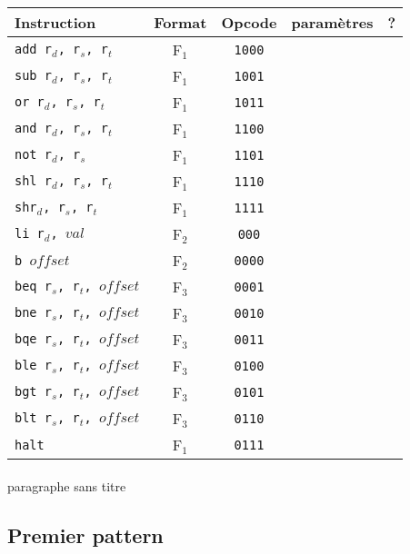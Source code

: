 \documentclass[a4paper]{article}
\begin{document}
			\begin{tabular}{|p{4cm}|c|c|c|c|}
			\hline Instruction & Format & Opcode & paramètres & ? \\ 
			\hline \texttt{add r$_{d}$, r$_{s}$, r$_{t}$} & F$_{1}$ & \texttt{1000} &  &  \\ 
			\hline \texttt{sub r$_{d}$, r$_{s}$, r$_{t}$} & F$_{1}$ & \texttt{1001} &  &  \\ 
			\hline \texttt{or r$_{d}$, r$_{s}$, r$_{t}$} & F$_{1}$ & \texttt{1011} &  &  \\ 
			\hline \texttt{and r$_{d}$, r$_{s}$, r$_{t}$} & F$_{1}$ & \texttt{1100} &  &  \\ 
			\hline \texttt{not r$_{d}$, r$_{s}$} & F$_{1}$ & \texttt{1101} &  &  \\ 
			\hline \texttt{shl r$_{d}$, r$_{s}$, r$_{t}$} & F$_{1}$ & \texttt{1110} &  &  \\ 
			\hline \texttt{shr$_{d}$, r$_{s}$, r$_{t}$} & F$_{1}$ & \texttt{1111} &  &  \\ 
			\hline \texttt{li r$_{d}$, $val$} & F$_{2}$ & \texttt{000} &  &  \\ 
			\hline \texttt{b $offset$} & F$_{2}$ & \texttt{0000} &  &  \\ 
			\hline \texttt{beq r$_{s}$, r$_{t}$, $offset$} & F$_{3}$ & \texttt{0001} &  &  \\ 
			\hline \texttt{bne r$_{s}$, r$_{t}$, $offset$} & F$_{3}$ & \texttt{0010} &  &  \\ 
			\hline \texttt{bqe r$_{s}$, r$_{t}$, $offset$} & F$_{3}$ & \texttt{0011} &  &  \\ 
			\hline \texttt{ble r$_{s}$, r$_{t}$, $offset$} & F$_{3}$ & \texttt{0100} &  &  \\ 
			\hline \texttt{bgt r$_{s}$, r$_{t}$, $offset$} & F$_{3}$ & \texttt{0101} &  &  \\ 
			\hline \texttt{blt r$_{s}$, r$_{t}$, $offset$} & F$_{3}$ & \texttt{0110} &  &  \\ 
			\hline \texttt{halt} & F$_{1}$ & \texttt{0111} &  &  \\ 
			\hline 
			\end{tabular}
			
			\paragraph{}{paragraphe sans titre}
		
		\subsection{Premier pattern}
\end{document}
